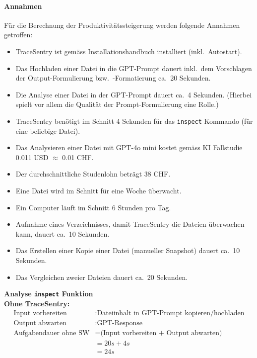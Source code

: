 \documentclass[a4paper,12pt]{report}
\begin{document}
    \paragraph*{Annahmen}
    Für die Berechnung der Produktivitätssteigerung werden folgende Annahmen getroffen:
    \begin{itemize}
        \item TraceSentry ist gemäss Installationshandbuch installiert (inkl.\ Autostart).
        \item Das Hochladen einer Datei in die GPT-Prompt dauert inkl.\ dem Vorschlagen der Output-Formulierung bzw.\ -Formatierung ca.\ 20 Sekunden.
        \item Die Analyse einer Datei in der GPT-Prompt dauert ca.\ 4 Sekunden.
        (Hierbei spielt vor allem die Qualität der Prompt-Formulierung eine Rolle.)
        \item TraceSentry benötigt im Schnitt 4 Sekunden für das \texttt{inspect} Kommando (für eine beliebige Datei).
        \item Das Analysieren einer Datei mit GPT-4o mini kostet gemäss KI Fallstudie 0.011 USD $\approx$ 0.01 CHF.
        \item Der durchschnittliche Studenlohn beträgt 38 CHF\@.
        \item Eine Datei wird im Schnitt für eine Woche überwacht.
        \item Ein Computer läuft im Schnitt 6 Stunden pro Tag.
        \item Aufnahme eines Verzeichnisses, damit TraceSentry die Dateien überwachen kann, dauert ca.\ 10 Sekunden.
        \item Das Erstellen einer Kopie einer Datei (manueller Snapshot) dauert ca.\ 10 Sekunden.
        \item Das Vergleichen zweier Dateien dauert ca.\ 20 Sekunden.
    \end{itemize}

    \clearpage

    \textbf{Analyse \texttt{inspect} Funktion} \\

    \textbf{Ohne TraceSentry:} \\
    \begin{align*}
        \text{Input vorbereiten}&: \text{Dateiinhalt in GPT-Prompt kopieren/hochladen}\\
        \text{Output abwarten}&: \text{GPT-Response} \\
        \text{Aufgabendauer ohne SW} &= \text{(Input vorbereiten + Output abwarten)} \\
        &= 20s + 4s \\
        &= 24s \\
    \end{align*}
\end{document}
